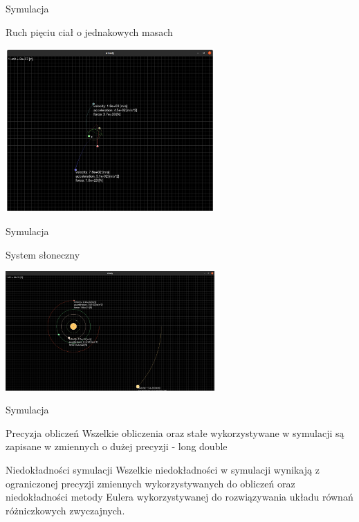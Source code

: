 \documentclass{beamer}
\begin{document}
\begin{frame}{Symulacja}
    \begin{block}{Ruch pięciu ciał o jednakowych masach}
        \begin{center}
            \includegraphics[width=8cm]{./img/five-bodies.png}
        \end{center}
    \end{block}
\end{frame}

\begin{frame}{Symulacja}
    \begin{block}{System słoneczny}
        \begin{center}
            \includegraphics[width=8cm]{./img/solar-system.png}
        \end{center}
    \end{block}
\end{frame}

\begin{frame}{Symulacja}
    \begin{block}{Precyzja obliczeń}
        Wszelkie obliczenia oraz stałe wykorzystywane w symulacji są zapisane w zmiennych o dużej precyzji - long double
    \end{block}
    \begin{block}{Niedokładności symulacji}
        Wszelkie niedokładności w symulacji wynikają z ograniczonej precyzji zmiennych wykorzystywanych do obliczeń oraz niedokładności metody Eulera wykorzystywanej do rozwiązywania układu równań różniczkowych zwyczajnych.
    \end{block}
\end{frame}
\end{document}
